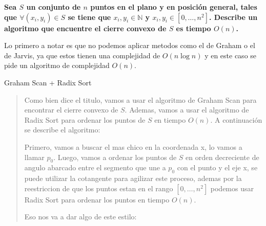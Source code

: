\textbf{Sea $S$ un conjunto de $n$ puntos en el plano y en posici\'on general, tales que $\forall (x_i, y_i) \in S$ se tiene que $x_i,y_i \in \mathbb{N}$ y $x_i, y_i \in [0, \dots, n^2]$. Describe un algoritmo que encuentre el cierre convexo de $S$ es tiempo $O(n)$.
}\vspace{.2cm}

Lo primero a notar es que no podemos aplicar metodos como el de Graham o el de Jarvis, ya que estos tienen una complejidad de $O(n \log n)$ y en este caso se pide un algoritmo de complejidad $O(n)$.\vspace{.3cm}

\textcolor{bibi}{Graham Scan + Radix Sort}\vspace{.2cm}
\begin{quote}
    Como bien dice el titulo, vamos a usar el algoritmo de Graham Scan para encontrar el cierre convexo de $S$. Ademas, vamos a usar el algoritmo de Radix Sort para ordenar los puntos de $S$ en tiempo $O(n)$. A continuaci\'on se describe el algoritmo:\vspace{.2cm}

    Primero, vamos a buscar el mas chico en la coordenada x, lo vamos a llamar $p_0$. Luego, vamos a ordenar los puntos de $S$ en orden decreciente de angulo abarcado entre el segmento que une a $p_0$ con el punto y el eje x, se puede utilizar la cotangente para agilizar este proceso, ademas por la reestriccion de que los puntos estan en el rango $[0, \dots, n^2]$ podemos usar Radix Sort para ordenar los puntos en tiempo $O(n)$.\vspace{.2cm}

    Eso nos va a dar algo de este estilo:\vspace{.2cm}
    \begin{center}
        \begin{figure}[H]
            \centering
            

\end{figure}
\end{center}
\end{quote}
